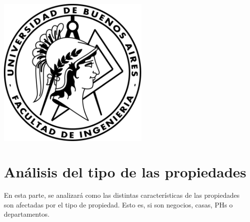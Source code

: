 \documentclass[a4paper, 10pt]{article}
\begin{document}
    \newpage

    \begin{center}
        \includegraphics[width=7.5cm, height=7.5cm]{images/logo}
    \end{center}


    \maketitle
    \newpage
    \tableofcontents
    \newpage
	\part{Análisis del tipo de las propiedades}
		En esta parte, se analizará como las distintas características de las propiedades son afectadas por el tipo de propiedad.
		Esto es, si son negocios, casas, PHs o departamentos.
\end{document}
